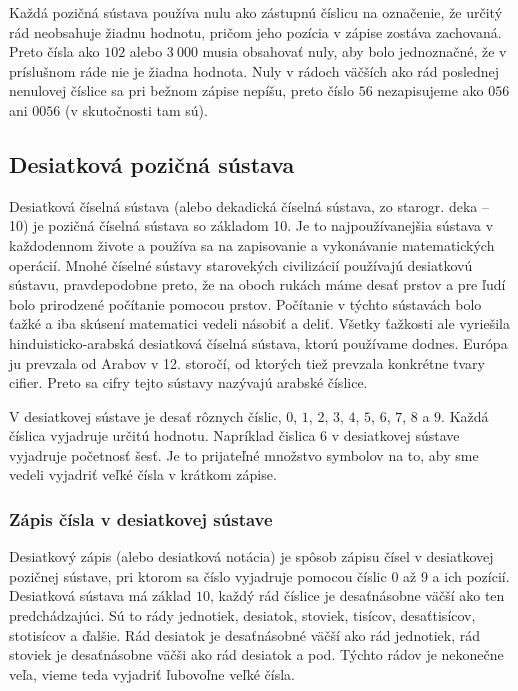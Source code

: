 \documentclass{article}
\begin{document}
Každá pozičná sústava používa nulu ako zástupnú číslicu na označenie, že určitý rád neobsahuje žiadnu hodnotu, pričom jeho pozícia v zápise zostáva zachovaná. Preto čísla ako \(102\) alebo \(3\ 000\) musia obsahovať nuly, aby bolo jednoznačné, že v príslušnom ráde nie je žiadna hodnota. Nuly v rádoch väčších ako rád poslednej nenulovej číslice sa pri bežnom zápise nepíšu, preto číslo \(56\) nezapisujeme ako \(056\) ani \(0056\) (v skutočnosti tam sú).

\subsection{Desiatková pozičná sústava}

Desiatková číselná sústava (alebo dekadická číselná sústava, zo starogr. deka – 10) je pozičná číselná sústava so základom 10. Je to najpoužívanejšia sústava v každodennom živote a používa sa na zapisovanie a vykonávanie matematických operácií. Mnohé číselné sústavy starovekých civilizácií používajú desiatkovú sústavu, pravdepodobne preto, že na oboch rukách máme desať prstov a pre ľudí bolo prirodzené počítanie pomocou prstov. Počítanie v týchto sústavách bolo ťažké a iba skúsení matematici vedeli násobiť a deliť. Všetky ťažkosti ale vyriešila hinduisticko‑arabská desiatková číselná sústava, ktorú používame dodnes. Európa ju prevzala od Arabov v 12. storočí, od ktorých tiež prevzala konkrétne tvary cifier. Preto sa cifry tejto sústavy nazývajú arabské číslice.

V desiatkovej sústave je desať rôznych číslic, \(0\), \(1\), \(2\), \(3\), \(4\), \(5\), \(6\), \(7\), \(8\) a \(9\). Každá číslica vyjadruje určitú hodnotu. Napríklad čislica \(6\) v desiatkovej sústave vyjadruje početnosť šesť. Je to prijateľné množstvo symbolov na to, aby sme vedeli vyjadriť veľké čísla v krátkom zápise.

\subsubsection{Zápis čísla v desiatkovej sústave}

Desiatkový zápis (alebo desiatková notácia) je spôsob zápisu čísel v desiatkovej pozičnej sústave, pri ktorom sa číslo vyjadruje pomocou číslic 0 až 9 a ich pozícií. Desiatková sústava má základ \(10\), každý rád číslice je desaťnásobne väčší ako ten predchádzajúci. Sú to rády jednotiek, desiatok, stoviek, tisícov, desaťtisícov, stotisícov a ďalšie. Rád desiatok je desaťnásobné väčší ako rád jednotiek, rád stoviek je desaťnásobne väčši ako rád desiatok a pod. Týchto rádov je nekonečne veľa, vieme teda vyjadriť ľubovoľne veľké čísla.
\end{document}
